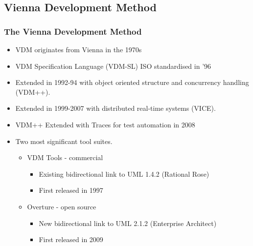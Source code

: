 \subsection{Vienna Development Method}
%
%
\frame
{
  \frametitle{The Vienna Development Method}


  \begin{itemize}
  		\item<1-> VDM originates from Vienna in the 1970s
  		\item<1-> VDM Specification Language (VDM-SL) ISO standardised in '96
  		\item<2-> Extended in 1992-94 with object oriented structure and concurrency handling (VDM++).
  		\item<3-> Extended in 1999-2007 with distributed real-time systems (VICE).
	  	\item<4-> VDM++ Extended with Traces for test automation in 2008
  		\item<5-> Two most significant tool suites.
  		\begin{itemize}
  			\item<6-> VDM Tools - commercial
			\begin{itemize}
				\item Existing bidirectional link to UML 1.4.2 (Rational Rose)
				\item First released in 1997
			\end{itemize}
  			\item<7-> Overture - open source
			\begin{itemize}
				\item New bidirectional link to UML 2.1.2 (Enterprise Architect)
				\item First released in 2009
			\end{itemize}
  		\end{itemize}

  \end{itemize}


}

%
%
%
%
%

